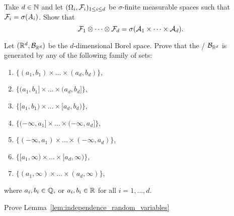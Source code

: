 \begin{problem}
Take $d \in \mathbb N$ and let $(\Omega_i, \mathcal F_i)_{1 \le i \le d}$ be $\sigma$-finite measurable spaces such that $\mathcal F_i = \sigma(A_i)$. Show that
\[
	\mathcal F_1 \otimes \dots \otimes \mathcal F_d = \sigma(\mathcal A_1 \times \dots \times \mathcal A_d).
\]
\end{problem}

\begin{problem}
Let $(\mathbb R^d, \mathcal B_{\mathbb R^d})$ be the $d$-dimensional Borel space. Prove that the \sigalg/ $\mathcal B_{\mathbb R^d}$ is generated by any of the following family of sets:
\begin{enumerate}[label={(\arabic*)}]
\item $\{(a_1, b_1) \times \dots \times (a_d,b_d)\}$,
\item $\{(a_1, b_1] \times \dots \times (a_d,b_d]\}$,
\item $\{[a_1, b_1) \times \dots \times [a_d,b_d)\}$,
\item $\{(-\infty,a_1] \times \dots \times (-\infty,a_d]\}$,
\item $\{(-\infty,a_1) \times \dots \times (-\infty, a_d)\}$,
\item $\{[a_1, \infty) \times \dots \times [a_d, \infty)\}$,
\item $\{(a_1,\infty) \times \dots \times (a_d, \infty)\}$,
\end{enumerate}
where $a_i, b_i \in \mathbb Q,$ or $a_i, b_i \in \mathbb R$ for all $i = 1, \dots, d$.
\end{problem}

\begin{problem}\label{prb:independence_random_variables}
Prove Lemma~\ref{lem:independence_random_variables}
\end{problem}
